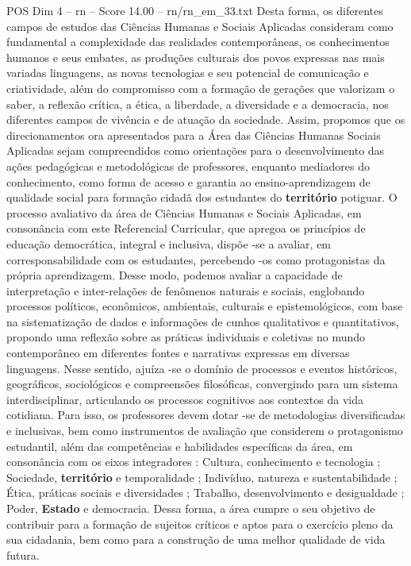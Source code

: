 \begin{textsample}{POS Dim 4 – rn – Score 14.00 – rn/rn\_em\_33.txt}
Desta forma, os diferentes campos de estudos das Ciências Humanas e Sociais Aplicadas consideram como fundamental a complexidade das realidades contemporâneas, os conhecimentos humanos e seus embates, as produções culturais dos povos expressas nas mais variadas linguagens, as novas tecnologias e seu potencial de comunicação e criatividade, além do compromisso com a formação de gerações que valorizam o saber, a reflexão crítica, a ética, a liberdade, a diversidade e a democracia, nos diferentes campos de vivência e de atuação da sociedade.
Assim, propomos que os direcionamentos ora apresentados para a Área das Ciências Humanas Sociais Aplicadas sejam compreendidos como orientações para o desenvolvimento das ações pedagógicas e metodológicas de professores, enquanto mediadores do conhecimento, como forma de acesso e garantia ao ensino-aprendizagem de qualidade social para formação cidadã dos estudantes do \textbf{território} potiguar.
O processo avaliativo da área de Ciências Humanas e Sociais Aplicadas, em consonância com este Referencial Curricular, que apregoa os princípios de educação democrática, integral e inclusiva, dispõe -se a avaliar, em corresponsabilidade com os estudantes, percebendo -os como protagonistas da própria aprendizagem.
Desse modo, podemos avaliar a capacidade de interpretação e inter-relações de fenômenos naturais e sociais, englobando processos políticos, econômicos, ambientais, culturais e epistemológicos, com base na sistematização de dados e informações de cunhos qualitativos e quantitativos, propondo uma reflexão sobre as práticas individuais e coletivas no mundo contemporâneo em diferentes fontes e narrativas expressas em diversas linguagens.
Nesse sentido, ajuíza -se o domínio de processos e eventos históricos, geográficos, sociológicos e compreensões filosóficas, convergindo para um sistema interdisciplinar, articulando os processos cognitivos aos contextos da vida cotidiana.
Para isso, os professores devem dotar -se de metodologias diversificadas e inclusivas, bem como instrumentos de avaliação que considerem o protagonismo estudantil, além das competências e habilidades específicas da área, em consonância com os eixos integradores : Cultura, conhecimento e tecnologia ; Sociedade, \textbf{território} e temporalidade ; Indivíduo, natureza e sustentabilidade ; Ética, práticas sociais e diversidades ; Trabalho, desenvolvimento e desigualdade ; Poder, \textbf{Estado} e democracia.
Dessa forma, a área cumpre o seu objetivo de contribuir para a formação de sujeitos críticos e aptos para o exercício pleno da sua cidadania, bem como para a construção de uma melhor qualidade de vida futura.

\end{textsample}
